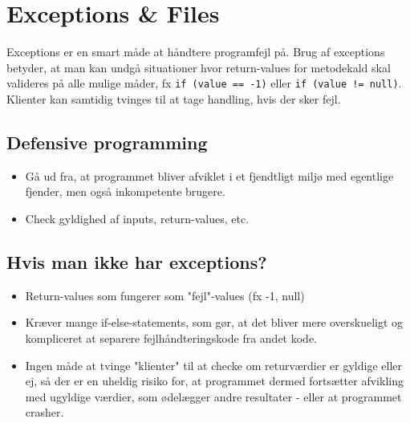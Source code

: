 \section{Exceptions \& Files}

Exceptions er en smart måde at håndtere programfejl på. Brug af exceptions betyder, at man kan undgå situationer hvor return-values for metodekald skal valideres på alle mulige måder, fx \verb|if (value == -1)| eller \verb|if (value != null)|. Klienter kan samtidig tvinges til at tage handling, hvis der sker fejl.

\subsection{Defensive programming}
\begin{itemize}
  \item Gå ud fra, at programmet bliver afviklet i et fjendtligt miljø med egentlige fjender, men også inkompetente brugere.
  \item Check gyldighed af inputs, return-values, etc.
\end{itemize}

\subsection{Hvis man ikke har exceptions?}
\begin{itemize}
  \item Return-values som fungerer som "fejl"-values (fx -1, null)
  \item Kræver mange if-else-statements, som gør, at det bliver mere  overskueligt og kompliceret at separere fejlhåndteringskode fra andet kode.
  \item Ingen måde at tvinge "klienter" til at checke om returværdier er gyldige eller ej, så der er en uheldig risiko for, at programmet dermed fortsætter afvikling med ugyldige værdier, som ødelægger andre resultater - eller at programmet crasher.
\end{itemize}

